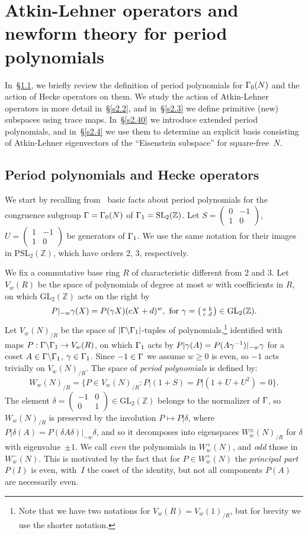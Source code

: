 \documentclass{amsart}
\theoremstyle{plain}
\theoremstyle{definition}
\numberwithin{equation}{section}
\newcommand{\Z}{{\mathbb Z}}
\def\SL{\mathrm{SL}} \def\PSL{\mathrm{PSL}}\def\GL{\mathrm{GL}}\def\PGL{\mathrm{PGL}}
\def\dd{\delta} \def\ss{\sigma}\def\wc{\widetilde{\chi}}
\def\sm#1#2#3#4{\left(\begin{smallmatrix}#1&#2 \\ #3 & #4 \end{smallmatrix}\right)}
\def\bsh{\backslash}
\begin{document}
\section{Atkin-Lehner operators and newform theory for period polynomials}
\label{S2}

 
In~\S\ref{s2.1}, we briefly review the definition of period polynomials 
for $\Gamma_0(N)$ and the action of Hecke operators on them. We study 
the action of Atkin-Lehner operators in more detail in~\S\ref{s2.2}, 
and in~\S\ref{s2.3} we define primitive (new) subspaces using trace maps. In~\S\ref{s2.40}
we introduce extended period polynomials, and in~\S\ref{s2.4} we use them 
 to determine an explicit basis consisting of Atkin-Lehner eigenvectors of the 
 ``Eisenstein subspace'' for square-free~$N$. 

\subsection{Period polynomials and Hecke operators} \label{s2.1}
We start  by recalling from~\cite{PP} basic facts about
period polynomials for the congruence subgroup $\Gamma=\Gamma_0(N)$ of
$\G_1=\SL_2(\Z)$. Let $S=\sm 0{-1}10$, $U=\sm 1{-1}10$ be generators of 
$\Gamma_1$. We use the same notation for their images in $\PSL_2(\Z)$, which have
orders 2, 3, respectively. 

We fix a commutative base ring $R$ of characteristic
different from 2 and 3.
Let $V_w(R)$ be the space of polynomials of degree at most $w$ 
with coefficients in $R$, on which $\GL_2(\Z)$ acts on the right by 
\[ P|_{-w}\g(X)=P(\g X) (cX+d)^{w}, \text{  for $\g=\sm abcd\in \GL_2(\Z$).} \]
Let $V_{w}(N)_{/R}$ 
be the space of $|\G\bsh\G_1|$-tuples of polynomials,\footnote{Note that we have
two notations for $V_w(R)=V_w(1)_{/R}$, but for brevity we use the shorter notation.}
identified with maps $P:\G\bsh \G_1 \rightarrow V_w(R) $, on which $\Gamma_1$ acts by 
$P|\gamma(A)=P(A\gamma^{-1})|_{-w} \gamma$ for a coset $A\in \G\bsh \G_1$, $\gamma \in\Gamma_1$. 
Since $-1\in\Gamma$ we assume $w\ge 0$ is even, so $-1$ acts trivially on $V_w(N)_{/R}$. 
The space of \emph{period polynomials} is defined by:
\[W_w(N)_{/R}=\{P\in V_w(N)_{/R} :  P|(1+S)=P|(1+U+U^2)=0\}. \]
The element $\dd=\sm {-1}001\in \GL_2(\Z)$ belongs to the normalizer of $\Gamma$, 
so $W_w(N)_{/R}$ is preserved
by the involution $P\mapsto P|\dd$, where $P|\dd(A)=P(\dd A\dd)|_{-w}\dd$, and so it 
decomposes into eigenspaces $W_w^\pm(N)_{/R}$ for $\dd$ with eigenvalue~$\pm 1$. 
We call \emph{even} the polynomials in $W_w^+(N)$, and \emph{odd} those in $W_w^-(N)$. This is 
motivated by the fact that for $P\in W_w^+(N)$ the \emph{principal part} $P(I)$ is even, with~$I$ the 
coset of the identity, but not all components $P(A)$ are necessarily even. 
\end{document}
